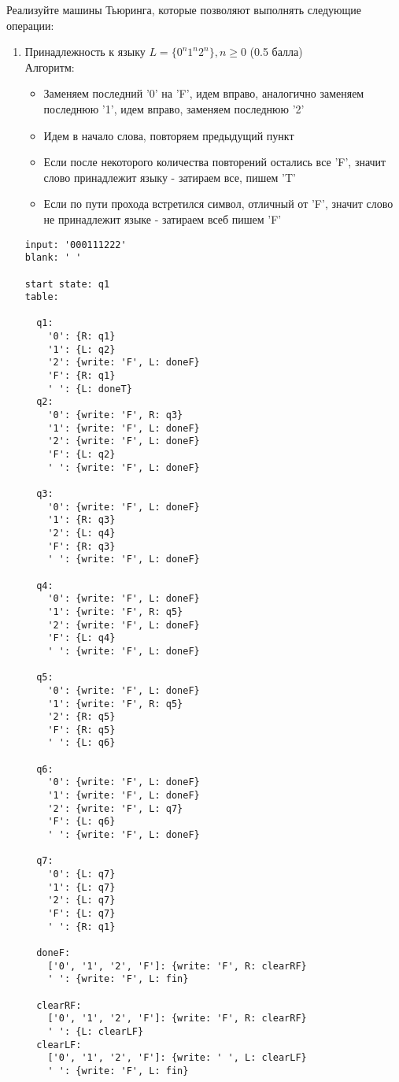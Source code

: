 \documentclass[a4paper]{article}
\begin{document}
Реализуйте машины Тьюринга, которые позволяют выполнять следующие операции:
\begin{enumerate}
    \item Принадлежность к языку $L = \{ 0^n1^n2^n \}, n \ge 0$ (0.5 балла) \\
		Алгоритм:
		\begin{itemize}
			\item Заменяем последний '0' на 'F', идем вправо, аналогично заменяем последнюю '1', идем вправо, заменяем последнюю '2'
			\item Идем в начало слова, повторяем предыдущий пункт
			\item Если после некоторого количества повторений остались все 'F', значит слово принадлежит языку - затираем все, пишем 'T'
			\item Если по пути прохода встретился символ, отличный от 'F', значит слово не принадлежит языке - затираем всеб пишем 'F'
		\end{itemize}
		\begin{verbatim}
input: '000111222'
blank: ' '

start state: q1
table:
  
  q1:
    '0': {R: q1}
    '1': {L: q2}
    '2': {write: 'F', L: doneF}
    'F': {R: q1}
    ' ': {L: doneT}
  q2:
    '0': {write: 'F', R: q3}
    '1': {write: 'F', L: doneF}
    '2': {write: 'F', L: doneF}
    'F': {L: q2}
    ' ': {write: 'F', L: doneF} 
  
  q3:
    '0': {write: 'F', L: doneF}
    '1': {R: q3}
    '2': {L: q4}
    'F': {R: q3}
    ' ': {write: 'F', L: doneF}
  
  q4:
    '0': {write: 'F', L: doneF}
    '1': {write: 'F', R: q5}
    '2': {write: 'F', L: doneF}
    'F': {L: q4}
    ' ': {write: 'F', L: doneF}
  
  q5:
    '0': {write: 'F', L: doneF}
    '1': {write: 'F', R: q5}
    '2': {R: q5}
    'F': {R: q5}
    ' ': {L: q6}
  
  q6:
    '0': {write: 'F', L: doneF}
    '1': {write: 'F', L: doneF}
    '2': {write: 'F', L: q7}
    'F': {L: q6}
    ' ': {write: 'F', L: doneF}
    
  q7:
    '0': {L: q7}
    '1': {L: q7}
    '2': {L: q7}
    'F': {L: q7}
    ' ': {R: q1}  
  
  doneF:
    ['0', '1', '2', 'F']: {write: 'F', R: clearRF}
    ' ': {write: 'F', L: fin}
    
  clearRF:
    ['0', '1', '2', 'F']: {write: 'F', R: clearRF}
    ' ': {L: clearLF}
  clearLF:
    ['0', '1', '2', 'F']: {write: ' ', L: clearLF}
    ' ': {write: 'F', L: fin}
  

\end{verbatim}
\end{enumerate}
\end{document}
